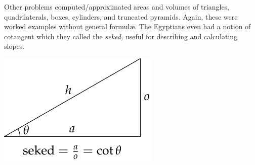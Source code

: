 \begin{minipage}[t]{0.69\linewidth}\vspace{0pt}
	Other problems computed/approximated areas and volumes of triangles, quadrilaterals, boxes, cylinders, and truncated pyramids. Again, these were worked examples without general formulæ. The Egyptians even had a notion of cotangent which they called the \emph{seked,} useful for describing and calculating slopes.
\end{minipage}
\hfill
\begin{minipage}[t]{0.3\linewidth}\vspace{0pt}
	\flushright\includegraphics[scale=0.95]{geo-01-seked}
\end{minipage}


\goodbreak


